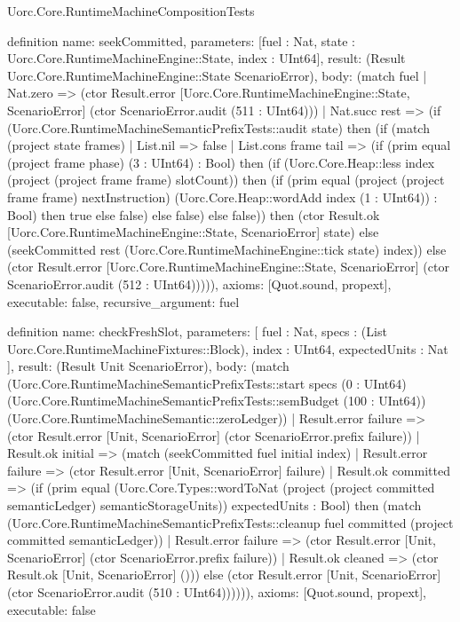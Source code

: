 \begin{lexlean}{Uorc.Core.RuntimeMachineCompositionTests}
\begin{semanticmodule}
definition{
  name: seekCommitted,
  parameters: [fuel : Nat, state : Uorc.Core.RuntimeMachineEngine::State, index : UInt64],
  result: (Result Uorc.Core.RuntimeMachineEngine::State ScenarioError),
  body: (match fuel
    | Nat.zero => (ctor Result.error [Uorc.Core.RuntimeMachineEngine::State, ScenarioError] (ctor ScenarioError.audit (511 : UInt64)))
    | Nat.succ rest => (if (Uorc.Core.RuntimeMachineSemanticPrefixTests::audit state) then (if (match (project state frames)
      | List.nil => false
      | List.cons frame tail => (if (prim equal (project frame phase) (3 : UInt64) : Bool) then (if (Uorc.Core.Heap::less index (project (project frame frame) slotCount)) then (if (prim equal (project (project frame frame) nextInstruction) (Uorc.Core.Heap::wordAdd index (1 : UInt64)) : Bool) then true else false) else false) else false)) then (ctor Result.ok [Uorc.Core.RuntimeMachineEngine::State, ScenarioError] state) else (seekCommitted rest (Uorc.Core.RuntimeMachineEngine::tick state) index)) else (ctor Result.error [Uorc.Core.RuntimeMachineEngine::State, ScenarioError] (ctor ScenarioError.audit (512 : UInt64))))),
  axioms: [Quot.sound, propext],
  executable: false,
  recursive_argument: fuel
}

definition{
  name: checkFreshSlot,
  parameters: [
    fuel : Nat,
    specs : (List Uorc.Core.RuntimeMachineFixtures::Block),
    index : UInt64,
    expectedUnits : Nat
  ],
  result: (Result Unit ScenarioError),
  body: (match (Uorc.Core.RuntimeMachineSemanticPrefixTests::start specs (0 : UInt64) (Uorc.Core.RuntimeMachineSemanticPrefixTests::semBudget (100 : UInt64)) (Uorc.Core.RuntimeMachineSemantic::zeroLedger))
    | Result.error failure => (ctor Result.error [Unit, ScenarioError] (ctor ScenarioError.prefix failure))
    | Result.ok initial => (match (seekCommitted fuel initial index)
      | Result.error failure => (ctor Result.error [Unit, ScenarioError] failure)
      | Result.ok committed => (if (prim equal (Uorc.Core.Types::wordToNat (project (project committed semanticLedger) semanticStorageUnits)) expectedUnits : Bool) then (match (Uorc.Core.RuntimeMachineSemanticPrefixTests::cleanup fuel committed (project committed semanticLedger))
        | Result.error failure => (ctor Result.error [Unit, ScenarioError] (ctor ScenarioError.prefix failure))
        | Result.ok cleaned => (ctor Result.ok [Unit, ScenarioError] ())) else (ctor Result.error [Unit, ScenarioError] (ctor ScenarioError.audit (510 : UInt64)))))),
  axioms: [Quot.sound, propext],
  executable: false
}


\end{semanticmodule}
\end{lexlean}
